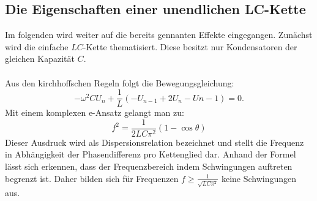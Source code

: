 \subsection{Die Eigenschaften einer unendlichen LC-Kette}

Im folgenden wird weiter auf die bereits gennanten Effekte eingegangen. Zunächst
 wird die einfache $LC$-Kette thematisiert. Diese besitzt nur Kondensatoren der
 gleichen Kapazität $C$.\\\\

Aus den kirchhoffschen Regeln folgt die Bewegungsgleichung:
\begin{equation}
- \omega ^2 C U_n + \frac{1}{L} \left( -U_{n-1} + 2U_ n -U{n-1} \right) = 0\text{.}
\end{equation}
Mit einem komplexen e-Ansatz gelangt man zu:
\begin{equation}
 f ^2 = \frac{1}{2LC\pi^2}(1-\cos\theta)
\end{equation}
Dieser Ausdruck wird als Dispersionsrelation bezeichnet und stellt die Frequenz in Abhängigkeit
 der Phasendifferenz pro Kettenglied dar. Anhand der Formel lässt sich erkennen,
  dass der Frequenzbereich indem Schwingungen auftreten begrenzt ist. Daher bilden sich
   für Frequenzen $f \geq \frac{1}{\sqrt{LC\pi^2}}$ keine Schwingungen aus.\\\\

